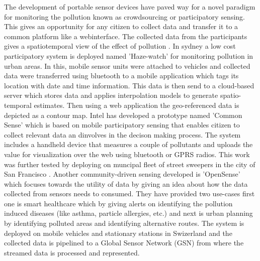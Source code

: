 The development of portable sensor devices have paved way for a novel paradigm for monitoring the pollution known as crowdsourcing or participatory sensing. This gives an opportunity for any citizen to collect data and transfer it to a common platform like a webinterface. The collected data  from the participants gives a spatiotemporal view of the effect of pollution \cite{Kanhere2013}. In sydney a low cost participatory system is deployed named 'Haze-watch' \cite{Sivaraman2013} for monitoring pollution in urban areas. In this, mobile sensor units were attached to vehicles and collected data were transferred using bluetooth to a mobile application which tags its location with date and time information. This data is then send to a cloud-based server which stores data and applies interpolation models \cite{Liao2006} to generate spatio-temporal estimates. Then using a web application the geo-referenced data is depicted as a contour map. 
Intel has developed a prototype named 'Common Sense' \cite{Dutta2009} which is based on mobile participatory sensing \cite{Abdelzaher2007} that enables citizen to collect relevant data an dinvolves in the decison making process. The system includes a handheld device that measures a couple of pollutants and uploads the value for visualization over the web using bluetooth or GPRS radios. This work was further tested by deploying on muncipal fleet of street sweepers in the city of San Francisco \cite{Aoki2008}. Another community-driven sensing developed is 'OpenSense' \cite{Aberer2010} which focuses towards the utility of data by giving an idea about how the data collected from sensors needs to consumed. They have provided two use-cases first one is smart healthcare which by giving alerts on identifying the pollution induced diseases (like asthma, particle allergies, etc.) and next is urban planning by identifying polluted areas and identifying alternative routes. The system is deployed on mobile vehicles and stationary stations in Swizerland and the collected data is pipelined to a Global Sensor Network (GSN) from where the streamed data is processed and represented. 

